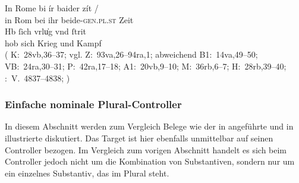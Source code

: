 \begin{exe}
\ex \label{ex:k_beider}

		\gll In Rome bi ír baider zít {/} \\
			in Rom bei ihr beide-\textsc{gen.pl.st} Zeit \\
		\gll Hb ſich vrlu̍g vnd ſtrit \\
			hob sich Krieg und Kampf \\
		\trans {}
			(%
				K:~28vb,36--37; vgl.
				Z:~93va,26--94ra,1; abweichend
				B1:~14va,49--50;
				VB:~24ra,30--31;
				P:~42ra,17--18;
				A1:~20vb,9--10;
				M:~36rb,6--7;
				H:~28rb,39--40;
				\KC:~V.~4837--4838;
				\cite[170]{schroeder1895}%
			)

\end{exe}

\subsubsection{Einfache nominale Plural-Controller}
\label{subsubsec:nomctrlpers}

In diesem Abschnitt werden zum Vergleich Belege wie der in
 angeführte und in  illustrierte
diskutiert. Das Target   ist hier ebenfalls unmittelbar
auf seinen Controller bezogen. Im Vergleich zum vorigen Abschnitt handelt es
sich beim Controller jedoch nicht um die Kombination von Substantiven, sondern
nur um ein einzelnes Substantiv, das im Plural steht.


